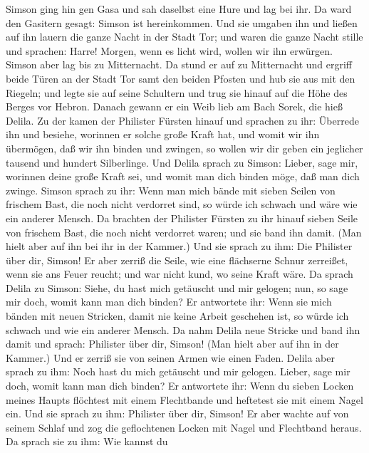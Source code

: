  Simson ging hin gen Gasa und sah daselbst eine Hure und lag
bei ihr.  Da ward den Gasitern gesagt: Simson ist
hereinkommen. Und sie umgaben ihn und ließen auf ihn lauern die ganze
Nacht in der Stadt Tor; und waren die ganze Nacht stille und sprachen:
Harre! Morgen, wenn es licht wird, wollen wir ihn erwürgen. 
Simson aber lag bis zu Mitternacht. Da stund er auf zu Mitternacht und
ergriff beide Türen an der Stadt Tor samt den beiden Pfosten und hub sie
aus mit den Riegeln; und legte sie auf seine Schultern und trug sie
hinauf auf die Höhe des Berges vor Hebron.  Danach gewann er
ein Weib lieb am Bach Sorek, die hieß Delila.  Zu der kamen
der Philister Fürsten hinauf und sprachen zu ihr: Überrede ihn und
besiehe, worinnen er solche große Kraft hat, und womit wir ihn
übermögen, daß wir ihn binden und zwingen, so wollen wir dir geben ein
jeglicher tausend und hundert Silberlinge.  Und Delila
sprach zu Simson: Lieber, sage mir, worinnen deine große Kraft sei, und
womit man dich binden möge, daß man dich zwinge.  Simson
sprach zu ihr: Wenn man mich bände mit sieben Seilen von frischem Bast,
die noch nicht verdorret sind, so würde ich schwach und wäre wie ein
anderer Mensch.  Da brachten der Philister Fürsten zu ihr
hinauf sieben Seile von frischem Bast, die noch nicht verdorret waren;
und sie band ihn damit.  (Man hielt aber auf ihn bei ihr in
der Kammer.) Und sie sprach zu ihm: Die Philister über dir, Simson! Er
aber zerriß die Seile, wie eine flächserne Schnur zerreißet, wenn sie
ans Feuer reucht; und war nicht kund, wo seine Kraft wäre. 
Da sprach Delila zu Simson: Siehe, du hast mich getäuscht und mir
gelogen; nun, so sage mir doch, womit kann man dich binden?
 Er antwortete ihr: Wenn sie mich bänden mit neuen
Stricken, damit nie keine Arbeit geschehen ist, so würde ich schwach und
wie ein anderer Mensch.  Da nahm Delila neue Stricke und
band ihn damit und sprach: Philister über dir, Simson! (Man hielt aber
auf ihn in der Kammer.) Und er zerriß sie von seinen Armen wie einen
Faden.  Delila aber sprach zu ihm: Noch hast du mich
getäuscht und mir gelogen. Lieber, sage mir doch, womit kann man dich
binden? Er antwortete ihr: Wenn du sieben Locken meines Haupts flöchtest
mit einem Flechtbande und heftetest sie mit einem Nagel ein.
 Und sie sprach zu ihm: Philister über dir, Simson! Er aber
wachte auf von seinem Schlaf und zog die geflochtenen Locken mit Nagel
und Flechtband heraus.  Da sprach sie zu ihm: Wie kannst du
